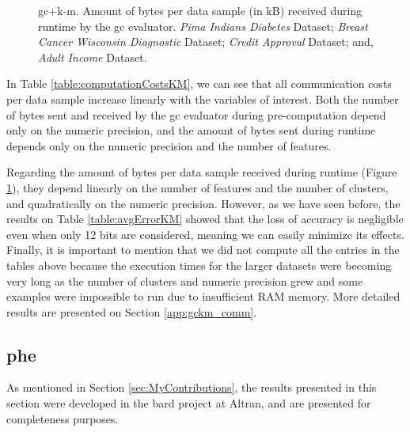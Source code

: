 \begin{figure}[!h]
\vspace*{-0.2cm}
\caption[\acs{gc}+\acs{k-m}. Amount of bytes per data sample (in kB) received during runtime by the \ac{gc} evaluator. All datasets.]{\acs{gc}+\acs{k-m}. Amount of bytes per data sample (in kB) received during runtime by the \ac{gc} evaluator.
 \emph{Pima Indians Diabetes} Dataset;
 \emph{Breast Cancer Wisconsin Diagnostic} Dataset;
 \emph{Credit Approval} Dataset; and,
 \emph{Adult Income} Dataset.}%
\label{fig:km-gc-comm}%
\vspace*{-0.2cm}
\end{figure}


In Table \ref{table:computationCostsKM}, we can see that all communication costs per data sample increase linearly with the variables of interest. Both the number of bytes sent and received by the \ac{gc} evaluator during pre-computation depend only on the numeric precision, and the amount of bytes sent during runtime depends only on the numeric precision and the number of features.

Regarding the amount of bytes per data sample received during runtime (Figure \ref{fig:km-gc-comm}), they depend linearly on the number of features and the number of clusters, and quadratically on the numeric precision. However, as we have seen before, the results on Table \ref{table:avgErrorKM} showed that the loss of accuracy is negligible even when only 12 bits are considered, meaning we can easily minimize its effects. Finally, it is important to mention that we did not compute all the entries in the tables above because the execution times for the larger datasets were becoming very long as the number of clusters and numeric precision grew and some examples were impossible to run due to insufficient RAM memory. More detailed results are presented on Section \ref{app:gckm_comm}.


\subsection{\acl{phe}}
\label{ssec:comm_phe}

As mentioned in Section \ref{sec:MyContributions}, the results presented in this section were developed in the \ac{bard} project at Altran, and are presented for completeness purposes.

